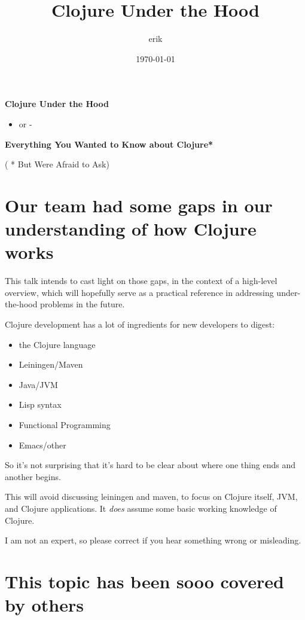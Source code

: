 \documentclass[11pt]{article}
\author{erik}
\date{\today}
\title{Clojure Under the Hood}
\begin{document}
\maketitle
\tableofcontents

\textbf{Clojure Under the Hood}

\begin{itemize}
\item or -
\end{itemize}

\textbf{Everything You Wanted to Know about Clojure*}










( * But Were Afraid to Ask)

\section{Our team had some gaps in our understanding of how Clojure works}
\label{sec:orgheadline1}

This talk intends to cast light on those gaps, in the context of a high-level overview,
which will hopefully serve as a practical reference in addressing under-the-hood
problems in the future.

Clojure development has a lot of ingredients for new developers to digest:
\begin{itemize}
\item the Clojure language
\item Leiningen/Maven
\item Java/JVM
\item Lisp syntax
\item Functional Programming
\item Emacs/other
\end{itemize}

So it's not surprising that it's hard to be clear about where one thing ends and
another begins.

This will avoid discussing leiningen and maven,
to focus on Clojure itself, JVM, and Clojure applications.
It \emph{does} assume some basic working knowledge of Clojure.

I am not an expert, so please correct if you hear something wrong or misleading.

\section{This topic has been sooo covered by others}
\label{sec:orgheadline2}
\end{document}
